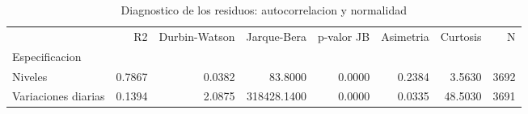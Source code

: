 \begin{table}
\caption{Diagnostico de los residuos: autocorrelacion y normalidad}
\label{tab:tabla7_diagnostico}
\begin{tabular}{lrrrrrrr}
\toprule
 & R2 & Durbin-Watson & Jarque-Bera & p-valor JB & Asimetria & Curtosis & N \\
Especificacion &  &  &  &  &  &  &  \\
\midrule
Niveles & 0.7867 & 0.0382 & 83.8000 & 0.0000 & 0.2384 & 3.5630 & 3692 \\
Variaciones diarias & 0.1394 & 2.0875 & 318428.1400 & 0.0000 & 0.0335 & 48.5030 & 3691 \\
\bottomrule
\end{tabular}
\end{table}
